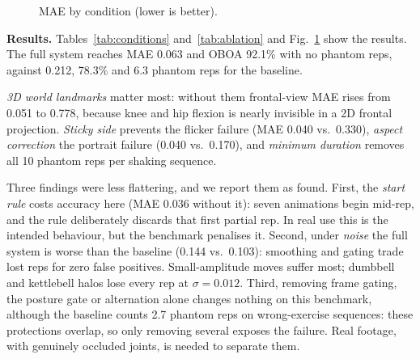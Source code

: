 \documentclass[conference]{IEEEtran}
\begin{document}
\begin{figure}[t]
\centering
{}
\caption{MAE by condition (lower is better).}
\label{fig:conditions}
\end{figure}

\textbf{Results.} Tables~\ref{tab:conditions} and~\ref{tab:ablation} and Fig.~\ref{fig:conditions} show the
results. The full system reaches MAE 0.063 and OBOA 92.1\% with no phantom reps,
against 0.212, 78.3\% and 6.3 phantom reps for the baseline.

\emph{3D world landmarks} matter most: without them frontal-view MAE rises from 0.051
to 0.778, because knee and hip flexion is nearly invisible in a 2D frontal projection.
\emph{Sticky side} prevents the flicker failure (MAE 0.040 vs.\ 0.330), \emph{aspect
correction} the portrait failure (0.040 vs.\ 0.170), and \emph{minimum duration}
removes all 10 phantom reps per shaking sequence.

Three findings were less flattering, and we report them as found. First, the
\emph{start rule} costs accuracy here (MAE 0.036 without it): seven animations begin
mid-rep, and the rule deliberately discards that first partial rep. In real use this
is the intended behaviour, but the benchmark penalises it. Second, under \emph{noise}
the full system is worse than the baseline (0.144 vs.\ 0.103): smoothing and gating
trade lost reps for zero false positives. Small-amplitude moves suffer most; dumbbell
and kettlebell halos lose every rep at $\sigma=0.012$. Third, removing frame gating,
the posture gate or alternation alone changes nothing on this benchmark, although the
baseline counts 2.7 phantom reps on wrong-exercise sequences: these protections
overlap, so only removing several exposes the failure. Real footage, with genuinely
occluded joints, is needed to separate them.
\end{document}
